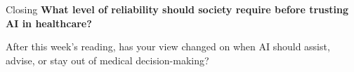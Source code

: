 \documentclass[aspectratio=169]{beamer}
\begin{document}
\begin{frame}{Closing}
\centering
\textbf{What level of reliability should society require before trusting AI in healthcare?}

\vspace{0.3cm}
After this week's reading, has your view changed on when AI should assist, advise, or stay out of medical decision-making?

\end{frame}
\end{document}
